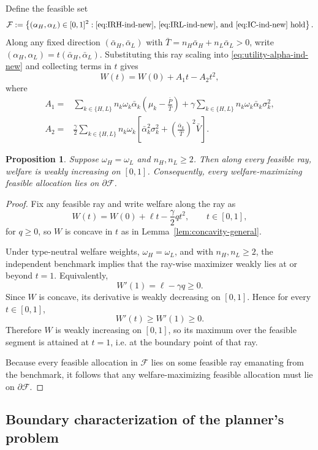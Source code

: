 \documentclass[a4paper,12pt]{article}
\newtheorem{proposition}[theorem]{Proposition}
\theoremstyle{definition}
\theoremstyle{remark}
\newcommand{\1}{\mathbf{1}}
\begin{document}
Define the feasible set
\[
\mathcal F
:=
\left\{(\alpha_H,\alpha_L) \in [0,1]^2 :
\text{\eqref{eq:IRH-ind-new}, \eqref{eq:IRL-ind-new}, and \eqref{eq:IC-ind-new} hold}
\right\}.
\]
Along any fixed direction \((\bar\alpha_H,\bar\alpha_L)\) with
\(\bar T=n_H\bar\alpha_H+n_L\bar\alpha_L>0\), write
\((\alpha_H,\alpha_L)=t(\bar\alpha_H,\bar\alpha_L)\). Substituting this ray
scaling into \eqref{eq:utility-alpha-ind-new} and collecting terms in \(t\)
gives
\[
W(t)=W(0)+A_1t-A_2t^2,
\]
where
\begin{align*}
A_1
={}&
\sum_{k\in\{H,L\}} n_k \omega_k \bar\alpha_k
\left(\mu_k-\frac{\bar P}{\bar T}\right)
+
\gamma
\sum_{k\in\{H,L\}} n_k \omega_k \bar\alpha_k \sigma_k^2,
\\
A_2
={}&
\frac{\gamma}{2}
\sum_{k\in\{H,L\}} n_k \omega_k
\left[
\bar\alpha_k^2 \sigma_k^2
+
\left(\frac{\bar\alpha_k}{\bar T}\right)^2 \bar V
\right].
\end{align*}


\begin{proposition}
\label{prop:boundary-opt-ind-new}
Suppose \(\omega_H=\omega_L\) and \(n_H,n_L\ge 2\). Then along every feasible
ray, welfare is weakly increasing on \([0,1]\). Consequently, every
welfare-maximizing feasible allocation lies on \(\partial\mathcal F\).
\end{proposition}

\begin{proof}
Fix any feasible ray and write welfare along the ray as
\[
W(t)=W(0)+\ell t-\frac{\gamma}{2}qt^2, \qquad t\in[0,1],
\]
for \(q\ge 0\), so \(W\) is concave in \(t\) as in Lemma~\ref{lem:concavity-general}.

Under type-neutral welfare weights, \(\omega_H=\omega_L\), and with
\(n_H,n_L\ge 2\), the independent benchmark implies that the ray-wise
maximizer weakly lies at or beyond \(t=1\). Equivalently,
\[
W'(1)=\ell-\gamma q \ge 0.
\]
Since \(W\) is concave, its derivative is weakly decreasing on \([0,1]\). Hence
for every \(t\in[0,1]\),
\[
W'(t)\ge W'(1)\ge 0.
\]
Therefore \(W\) is weakly increasing on \([0,1]\), so its maximum over the
feasible segment is attained at \(t=1\), i.e. at the boundary point of that ray.

Because every feasible allocation in \(\mathcal F\) lies on some feasible ray
emanating from the benchmark, it follows that any welfare-maximizing feasible
allocation must lie on \(\partial\mathcal F\).
\end{proof}


\subsection{Boundary characterization of the planner’s problem}
\end{document}
